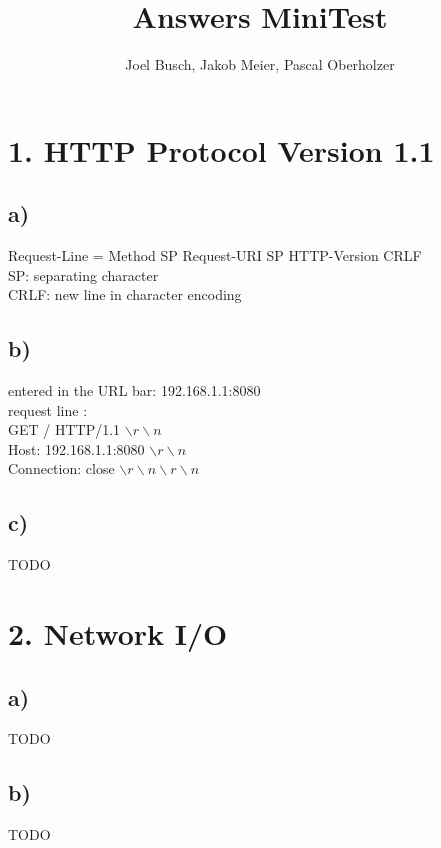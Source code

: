 \documentclass[10pt,a4paper]{article}
\title{Answers MiniTest}
\author{Joel Busch, Jakob Meier, Pascal Oberholzer}
\begin{document}
	\maketitle
	
	\section*{1. HTTP Protocol Version 1.1}
		\subsection*{a)}
			Request-Line = Method SP Request-URI SP HTTP-Version CRLF \\
			SP: separating character \\
			CRLF: new line in character encoding \\
		
		\subsection*{b)}
			entered in the URL bar: 192.168.1.1:8080 \\
			request line : \\
			\hspace*{5mm}GET / HTTP/1.1 $\backslash r \backslash n$\\
			\hspace*{5mm}Host: 192.168.1.1:8080 $\backslash r \backslash n$\\
			\hspace*{5mm}Connection: close $\backslash r \backslash n \backslash r \backslash n$\\
		
		\subsection*{c)}
			TODO \\
		
	
	\section*{2. Network I/O}
		\subsection*{a)}
			TODO \\
		
		\subsection*{b)}
			TODO \\
		
\end{document}
